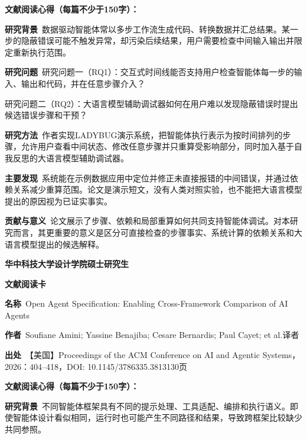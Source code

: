 \noindent\textbf{文献阅读心得（每篇不少于150字）：}\par
\noindent\textbf{研究背景}\ 数据驱动智能体常以多步工作流生成代码、转换数据并汇总结果。某一步的隐蔽错误可能不触发异常，却污染后续结果，用户需要检查中间输入输出并限定重新执行范围。\par
\noindent\textbf{研究问题}\ 研究问题一（RQ1）：交互式时间线能否支持用户检查智能体每一步的输入、输出和代码，并在任意步骤介入？\par
研究问题二（RQ2）：大语言模型辅助调试器如何在用户难以发现隐蔽错误时提出候选错误步骤和干预？\par
\noindent\textbf{研究方法}\ 作者实现LADYBUG演示系统，把智能体执行表示为按时间排列的步骤，允许用户查看中间状态、修改任意步骤并只重算受影响部分，同时加入基于自我反思的大语言模型辅助调试器。\par
\noindent\textbf{主要发现}\ 系统能在示例数据应用中定位并修正未直接报错的中间错误，并通过依赖关系减少重算范围。论文是演示短文，没有人类对照实验，也不能把大语言模型提出的原因视为已证实事实。\par
\noindent\textbf{贡献与意义}\ 论文展示了步骤、依赖和局部重算如何共同支持智能体调试。对本研究而言，其更重要的意义是区分可直接检查的步骤事实、系统计算的依赖关系和大语言模型提出的候选解释。\par
\clearpage
\begin{center}
{\songti\bfseries\fontsize{18.5pt}{27.75pt}\selectfont 华中科技大学设计学院硕士研究生\par}
{\songti\bfseries\fontsize{18.5pt}{27.75pt}\selectfont 文献阅读卡\par}
\end{center}
\vspace{0.25em}
\noindent\underline{}\par
\vspace{0.35em}
\noindent\textbf{名称}\ Open Agent Specification: Enabling Cross-Framework Comparison of AI Agents\par
\noindent\textbf{作者}\ Soufiane Amini; Yassine Benajiba; Cesare Bernardis; Paul Cayet; et al.\quad 译者\par
\noindent\textbf{出处}\ 【美国】Proceedings of the ACM Conference on AI and Agentic Systems，2026：404–418，DOI: 10.1145/3786335.3813130\quad 页\par
\vspace{0.35em}
\noindent\textbf{文献阅读心得（每篇不少于150字）：}\par
\noindent\textbf{研究背景}\ 不同智能体框架具有不同的提示处理、工具适配、编排和执行语义。即使智能体设计看似相同，运行时也可能产生不同路径和结果，导致跨框架比较缺少共同参照。\par
